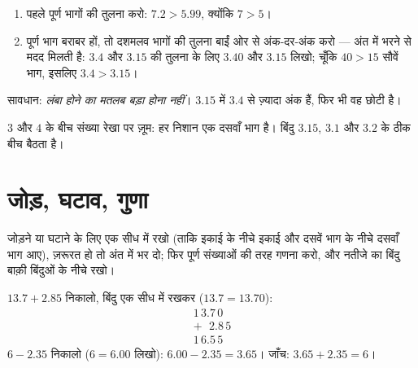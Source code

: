 \begin{method}[दशमलव संख्याओं की तुलना]\label{met:g6:decimals:compare}
\begin{enumerate}
  \item पहले पूर्ण भागों की तुलना करो: $7.2 > 5.99$, क्योंकि $7 > 5$।
  \item पूर्ण भाग बराबर हों, तो दशमलव भागों की तुलना बाईं ओर से
        अंक-दर-अंक करो --- अंत में  भरने से मदद मिलती है:
        $3.4$ और $3.15$ की तुलना के लिए $3.40$ और $3.15$ लिखो;
        चूँकि $40 > 15$ सौवें भाग, इसलिए $3.4 > 3.15$।
\end{enumerate}
सावधान: \emph{लंबा होने का मतलब बड़ा होना नहीं}। $3.15$ में
$3.4$ से ज़्यादा अंक हैं, फिर भी वह छोटी है।
\end{method}

\begin{omfigure}

{\small $3$ और $4$ के बीच संख्या रेखा पर ज़ूम: हर निशान एक दसवाँ
भाग है। बिंदु $3.15$, $3.1$ और $3.2$ के ठीक बीच बैठता है।}
\end{omfigure}

\section{जोड़, घटाव, गुणा}

\begin{method}\label{met:g6:decimals:columns}
 जोड़ने या घटाने के लिए \emph{} एक सीध
में रखो (ताकि इकाई के नीचे इकाई और दसवें भाग के नीचे दसवाँ भाग
आए), ज़रूरत हो तो अंत में  भर दो; फिर पूर्ण संख्याओं की तरह
गणना करो, और नतीजे का बिंदु बाक़ी बिंदुओं के नीचे रखो।
\end{method}

\begin{example}\label{ex:g6:decimals:addsub}
$13.7 + 2.85$ निकालो, बिंदु एक सीध में रखकर ($13.7 = 13.70$):
\[
\begin{array}{r}
1\,3.7\,0 \\
+\ \ \,2.8\,5 \\
\hline
1\,6.5\,5
\end{array}
\]
$6 - 2.35$ निकालो ($6 = 6.00$ लिखो):
$6.00 - 2.35 = 3.65$। जाँच: $3.65 + 2.35 = 6$।
\end{example}

